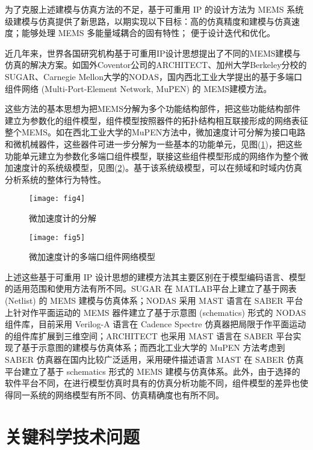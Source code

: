 \documentclass[no-math]{YangThesis}
\begin{document}
为了克服上述建模与仿真方法的不足，基于可重用 IP 的设计方法为 MEMS 系统级建模与仿真提供了新思路，以期实现以下目标：高的仿真精度和建模与仿真速度；能够处理 MEMS 多能量域耦合的固有特性； 便于设计迭代和优化。

近几年来，世界各国研究机构基于可重用IP设计思想提出了不同的MEMS建模与仿真的解决方案。如国外Coventor公司的ARCHITECT\cite{bibc54}、加州大学Berkeley分校的SUGAR\cite{bibc55}、Carnegie Mellon大学的NODAS\cite{bibc56}，国内西北工业大学提出的基于多端口组件网络 (Multi-Port-Element Network, MuPEN) 的 MEMS建模方法\cite{bibc57}。

这些方法的基本思想为把MEMS分解为多个功能结构部件，把这些功能结构部件建立为参数化的组件模型，组件模型按照器件的拓扑结构相互联接形成的网络表征整个MEMS。如在西北工业大学的MuPEN方法中\cite{bibc58}，微加速度计可分解为接口电路和微机械器件，这些器件可进一步分解为一些基本的功能单元，见图(\ref{fig4})，把这些功能单元建立为参数化多端口组件模型，联接这些组件模型形成的网络作为整个微加速度计的系统级模型，见图(\ref{fig5})。基于该系统级模型，可以在频域和时域内仿真分析系统的整体行为特性。

\begin{figure}[!htbp]
	\centering
	\texttt{[image: fig4]}
	\caption{微加速度计的分解}
     \label{fig4}
\end{figure}

\begin{figure}[!htbp]
	\centering
	\texttt{[image: fig5]}
	\caption{微加速度计的多端口组件网络模型}
     \label{fig5}
\end{figure}

上述这些基于可重用 IP 设计思想的建模方法其主要区别在于模型编码语言、模型的适用范围和使用方法有所不同。SUGAR 在 MATLAB平台上建立了基于网表(Netlist) 的 MEMS 建模与仿真体系；NODAS 采用 MAST 语言在 SABER 平台上针对作平面运动的 MEMS 器件建立了基于示意图 (schematics) 形式的 NODAS 组件库，目前采用 Verilog-A 语言在 Cadence Spectre 仿真器把局限于作平面运动的组件库扩展到三维空间；ARCHITECT 也采用 MAST 语言在 SABER 平台实现了基于示意图的建模与仿真体系；而西北工业大学的 MuPEN 方法考虑到 SABER 仿真器在国内比较广泛适用，采用硬件描述语言 MAST 在 SABER 仿真平台建立了基于 schematics 形式的 MEMS 建模与仿真体系。此外，由于选择的软件平台不同，在进行模型仿真时具有的仿真分析功能不同，组件模型的差异也使得同一系统的网络模型有所不同、仿真精确度也有所不同。

\newpage
\section{关键科学技术问题}
\end{document}
